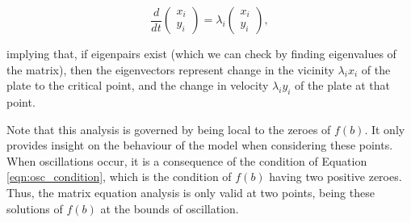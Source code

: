 \documentclass{article}
\begin{document}
\begin{equation}
	\frac{d}{dt} \begin{pmatrix}
		x_i \\
		y_i
	\end{pmatrix} = \lambda_i \begin{pmatrix}
	x_i \\
	y_i
\end{pmatrix},
\label{eqn:matrix_eigenvectors}
\end{equation}

implying that, if eigenpairs exist (which we can check by finding eigenvalues of the matrix),
then the eigenvectors represent change in the vicinity $\lambda_i x_i$ of the plate to the critical point,
and the change in velocity $\lambda_i y_i$ of the plate at that point.

Note that this analysis is governed by being local to the zeroes of $f(b)$.
It only provides insight on the behaviour of the model when considering these points.
When oscillations occur, it is a consequence of the condition of Equation \ref{eqn:osc_condition},
which is the condition of $f(b)$ having two positive zeroes.
Thus, the matrix equation analysis is only valid at two points,
being these solutions of $f(b)$ at the bounds of oscillation.
\end{document}
